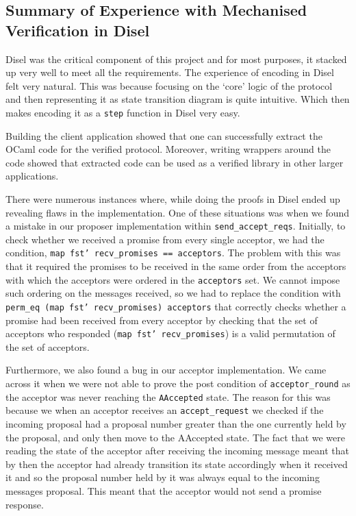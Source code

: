 \subsection{Summary of Experience with Mechanised Verification in Disel}
Disel was the critical component of this project and for most purposes, it
stacked up very well to meet all the requirements.
The experience of encoding in Disel felt very natural. This was because
focusing on the `core' logic of the protocol and then representing it
as state transition diagram is quite intuitive. Which then makes
encoding it as a \texttt{step} function in Disel very easy.

Building the client application showed that one can successfully extract
the OCaml code for the verified protocol. Moreover, writing wrappers
around the code showed that extracted code can be used as a verified library
in other larger applications.

There were numerous instances where, while doing the proofs in Disel
ended up revealing flaws in the implementation. One of these situations was
when we found a mistake in our proposer implementation within
\texttt{send\_accept\_reqs}. Initially, to check
whether we received a promise from every single acceptor, we had the condition,
\texttt{map fst' recv\_promises == acceptors}. The problem with this was that
it required the promises to be received in the same order from the acceptors
with which the acceptors were ordered in the \texttt{acceptors} set. We cannot impose
such ordering on the messages received, so we had to replace the condition
with \texttt{perm\_eq (map fst' recv\_promises) acceptors} that correctly checks
whether a promise had been received from every acceptor by checking that
the set of acceptors who responded (\texttt{map fst' recv\_promises}) is
a valid permutation of the set of acceptors.

Furthermore, we also found a bug in our acceptor implementation. We came
across it when we were not able to prove the post condition of \texttt{acceptor\_round}
as the acceptor was never reaching the \texttt{AAccepted} state.
The reason for this was because we when an acceptor receives an \texttt{accept\_request}
we checked if the incoming proposal had a proposal number greater than the one
currently held by the proposal, and only then move to the AAccepted state. The fact
that we were reading the state of the acceptor after receiving the incoming message
meant that by then the acceptor had already transition its state accordingly
when it received it and so the proposal number held by it was always
equal to the incoming messages proposal. This meant that the acceptor would not
send a promise response.

